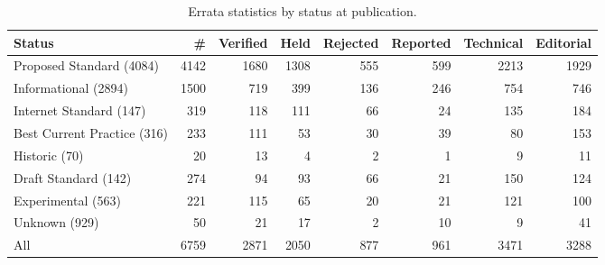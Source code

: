 \begin{table*}
\centering
\footnotesize
\begin{tabular}{lr|rrrr|rr}
\toprule
\textbf{Status} & \textbf{\#} & \textbf{Verified} & \textbf{Held} & \textbf{Rejected} & \textbf{Reported} & \textbf{Technical} & \textbf{Editorial} \\
\midrule
Proposed Standard (4084) & 4142  & 1680  & 1308  & 555  & 599  & 2213  & 1929 \\
Informational (2894) & 1500  & 719  & 399  & 136  & 246  & 754  & 746 \\
Internet Standard (147) & 319  & 118  & 111  & 66  & 24  & 135  & 184 \\
Best Current Practice (316) & 233  & 111  & 53  & 30  & 39  & 80  & 153 \\
Historic (70) & 20  & 13  & 4  & 2  & 1  & 9  & 11 \\
Draft Standard (142) & 274  & 94  & 93  & 66  & 21  & 150  & 124 \\
Experimental (563) & 221  & 115  & 65  & 20  & 21  & 121  & 100 \\
Unknown (929) & 50  & 21  & 17  & 2  & 10  & 9  & 41 \\
\midrule All & 6759  & 2871  & 2050  & 877  & 961  & 3471  & 3288 \\
\bottomrule
\end{tabular}
\caption{Errata statistics by status at publication.}
\label{tab:errata-stats-status}
\end{table*}
